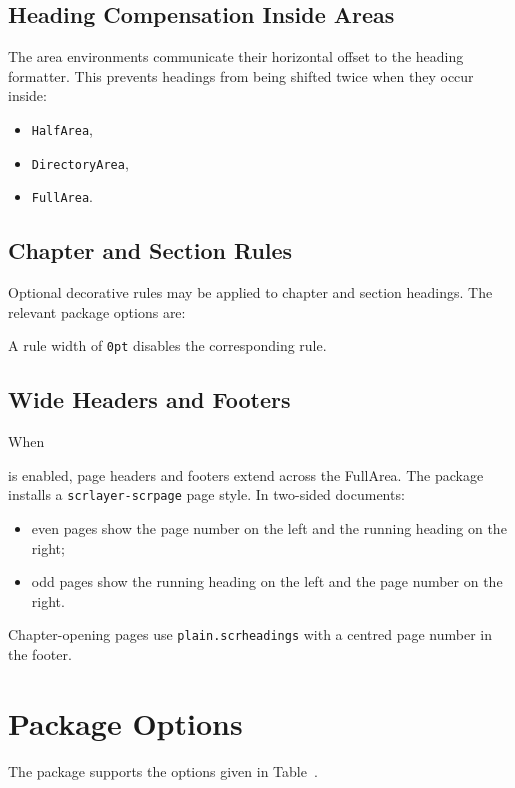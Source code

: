 \documentclass[
11pt,
a4paper,
oneside
]{scrbook}
\begin{document}
\section{Heading Compensation Inside Areas}
	
The area environments communicate their horizontal offset to the heading
formatter.
This prevents headings from being shifted twice when they occur inside:
\begin{itemize}
	\item \texttt{HalfArea},
	\item \texttt{DirectoryArea},
	\item \texttt{FullArea}.
\end{itemize}

\section{Chapter and Section Rules}

Optional decorative rules may be applied to chapter and section headings.
The relevant package options are:




A rule width of \texttt{0pt} disables the corresponding rule.

\section{Wide Headers and Footers}

When




	is enabled, page headers and footers extend across the FullArea.
	The package installs a \texttt{scrlayer-scrpage} page style.
	In two-sided documents:
	\begin{itemize}
		\item even pages show the page number on the left and the running heading
		on the right;
		\item odd pages show the running heading on the left and the page number
		on the right.
	\end{itemize}
	Chapter-opening pages use \texttt{plain.scrheadings} with a centred page
	number in the footer.
	
\chapter{Package Options}
\label{chap:options}
The \MDWordmark package supports the options given in
Table~.
\end{document}
